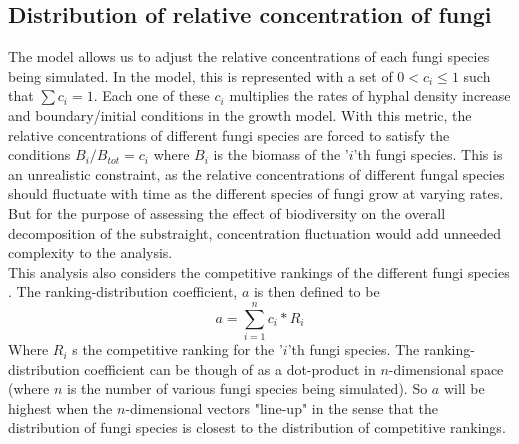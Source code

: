 \documentclass[10pt]{article}
\begin{document}
\subsection*{Distribution of relative concentration of fungi}
The model allows us to adjust the relative concentrations of each fungi species being simulated. In the model, this is represented with a set of $0<c_{i}\leq 1$ such that $\sum c_{i} = 1$. Each one of these $c_{i}$ multiplies the rates of hyphal density increase and boundary/initial conditions in the growth model. With this metric, the relative concentrations of different fungi species are forced to satisfy the conditions $B_{i}/B_{tot}=c_{i}$ where $B_{i}$ is the biomass of the '$i$'th fungi species. This is an unrealistic constraint, as the relative concentrations of different fungal species should fluctuate with time as the different species of fungi grow at varying rates. But for the purpose of assessing the effect of biodiversity on the overall decomposition of the substraight, concentration fluctuation would add unneeded complexity to the analysis. \\
This analysis also considers the competitive rankings of the different fungi species \cite{Maynard2019}. The ranking-distribution coefficient, $a$ is then defined to be
\begin{equation} \label{eq}
    a = \sum_{i=1}^{n} c_{i}*R_{i}
\end{equation}
Where $R_{i}$ s the competitive ranking for the '$i$'th fungi species. The ranking-distribution coefficient can be though of as a dot-product in $n$-dimensional space (where $n$ is the number of various fungi species being simulated). So $a$ will be highest when the $n$-dimensional vectors "line-up" in the sense that the distribution of fungi species is closest to the distribution of competitive rankings.\\
\end{document}
